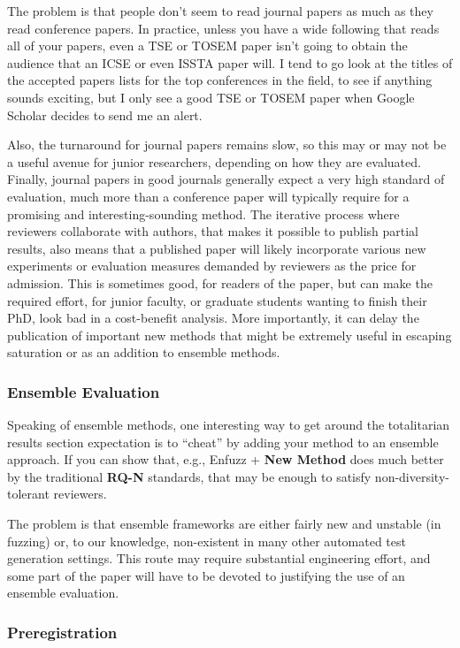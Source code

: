 \documentclass[sigplan,screen]{acmart}
\begin{document}
The problem is that people don't seem to read journal papers as much
as they read conference papers.  In practice, unless you have a wide
following that reads all of your papers, even a TSE or TOSEM paper
isn't going to obtain the audience that an ICSE or even ISSTA paper
will.  I tend to go look at the titles of the accepted papers lists for the
top conferences in the field, to see if anything sounds exciting, but I only see a good TSE or TOSEM
paper when Google Scholar decides to send me an alert.

Also, the turnaround for journal papers remains slow, so this
may or may not be a useful avenue for junior researchers, depending on
how they are evaluated.  Finally, journal papers in good journals generally expect a
very high standard of evaluation, much more than a conference paper
will typically require for a promising and interesting-sounding
method.  The iterative process where reviewers collaborate with
authors, that makes it possible to publish partial results, also means
that a published paper will likely incorporate various new experiments
or evaluation measures demanded by reviewers as the price for
admission.  This is sometimes good, for readers of the paper, but can make the required effort,
for junior faculty, or graduate students wanting to finish their PhD,
look bad in a cost-benefit analysis.  More importantly, it can delay
the publication of important new methods that might be extremely
useful in escaping saturation or as an addition to ensemble methods.

\subsubsection{Ensemble Evaluation}

Speaking of ensemble methods, one interesting way to get around the totalitarian results section
expectation is to ``cheat'' by adding your method to an ensemble
approach.  If you can show that, e.g., Enfuzz + {\bf New Method} does much
better by the traditional {\bf RQ-N} standards, that may be enough to
satisfy non-diversity-tolerant reviewers.

The problem is that ensemble frameworks are either fairly new and
unstable (in fuzzing) or, to our knowledge, non-existent in many other
automated test generation settings.  This route may require
substantial engineering effort, and some part of the paper will have
to be devoted to justifying the use of an ensemble evaluation.

\subsubsection{Preregistration}
\end{document}
